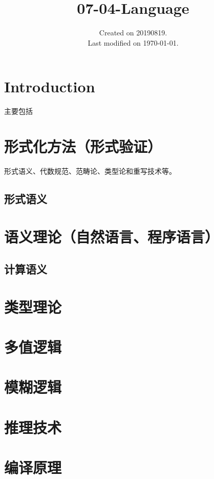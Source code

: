 \documentclass[UTF8]{../computerUniverse}
\begin{document}
\title{07-04-Language}
\date{Created on 20190819.\\   Last modified on \today.}
\maketitle
\tableofcontents


\chapter{Introduction}

主要包括


\chapter{形式化方法（形式验证）}
形式语义、代数规范、范畴论、类型论和重写技术等。
\section{形式语义}


\chapter{语义理论（自然语言、程序语言）}
\section{计算语义}


\chapter{类型理论}

\chapter{多值逻辑}
\chapter{模糊逻辑}
\chapter{推理技术}





\chapter{编译原理}
\end{document}
